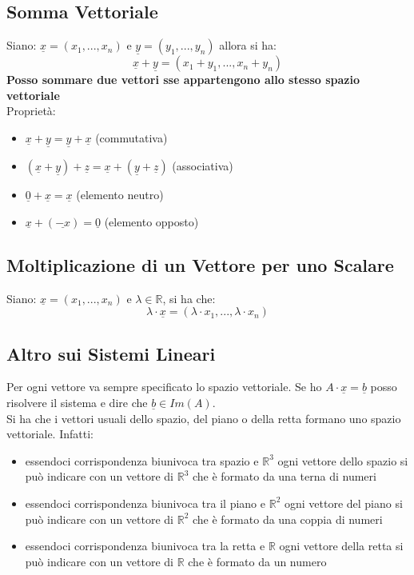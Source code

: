 \documentclass[a4paper,12pt, oneside]{book}
\begin{document}
\subsection{Somma Vettoriale}
Siano: $\underline{x}=(x_1,...,x_n)$ e $\underline{y}=(y_1,...,y_n)$ allora si ha:
$$\underline{x}+\underline{y}=(x_1+y_1,...,x_n+y_n)$$
\textbf{Posso sommare due vettori sse appartengono allo stesso spazio vettoriale}\\
Proprietà:
\begin{itemize}
\item $\underline{x}+\underline{y}=\underline{y}+\underline{x}$ (commutativa)
\item $(\underline{x}+\underline{y})+\underline{z}=\underline{x}+(\underline{y}+\underline{z})$ (associativa)
\item $\underline{0}+\underline{x}=\underline{x}$ (elemento neutro)
\item $\underline{x}+(\underline{-x})=\underline{0}$ (elemento opposto)
\end{itemize}
\subsection{Moltiplicazione di un Vettore per uno Scalare}
Siano: $\underline{x}=(x_1,...,x_n)$ e $\lambda\in\mathbb{R}$, si ha che:
$$\lambda\cdot\underline{x}=(\lambda\cdot x_1,...,\lambda\cdot x_n)$$
\subsection{Altro sui Sistemi Lineari}
Per ogni vettore va sempre specificato lo spazio vettoriale. Se ho $A\cdot \underline{x}=\underline{b}$ posso risolvere il sistema e dire che $\underline{b}\in Im(A)$.\\
Si ha che i vettori usuali dello spazio, del piano o della retta formano uno spazio vettoriale. Infatti:
\begin{itemize}
\item essendoci corrispondenza biunivoca tra spazio e $\mathbb{R}^3$ ogni vettore dello spazio si può indicare con un vettore di $\mathbb{R}^3$ che è formato da una terna di numeri
\item essendoci corrispondenza biunivoca tra il piano e $\mathbb{R}^2$ ogni vettore del piano si può indicare con un vettore di $\mathbb{R}^2$ che è formato da una coppia di numeri
\item essendoci corrispondenza biunivoca tra la retta e $\mathbb{R}$ ogni vettore della retta si può indicare con un vettore di $\mathbb{R}$ che è formato da un numero
\end{itemize}
\end{document}
